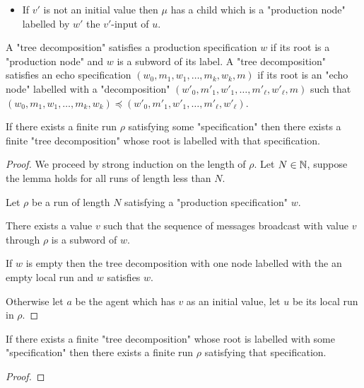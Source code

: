 \begin{definition}
\begin{itemize}
\begin{itemize}
			\item If $v'$ is not an initial value then $\mu$ has a child which is a "production node" labelled by $w'$ the $v'$-input of $u$.
		\end{itemize}
	\end{itemize}
\end{definition}

\begin{definition}
	A "tree decomposition" satisfies a production specification $w$ if its root is a "production node" and $w$ is a subword of its label.
	A "tree decomposition" satisfies an echo specification $(w_0, m_1, w_1, \ldots, m_k, w_k,m)$ if its root is an "echo node" labelled with a "decomposition" $(w'_0, m'_1, w'_1, \ldots, m'_\ell, w'_\ell,m)$ such that  $(w_0, m_1, w_1, \ldots, m_k, w_k) \preceq (w'_0, m'_1, w'_1, \ldots, m'_\ell, w'_\ell)$.
\end{definition}



\begin{lemma}
	If there exists a finite run $\rho$ satisfying some "specification" then there exists a finite "tree decomposition" whose root is labelled with that specification.
\end{lemma}

\begin{proof}
	We proceed by strong induction on the length of $\rho$.
	Let $N \in \mathbb{N}$, suppose the lemma holds for all runs of length less than $N$.
	
	Let $\rho$ be a run of length $N$ satisfying a "production specification" $w$.
		
	There exists a value $v$ such that the sequence of messages broadcast with value $v$ through $\rho$ is a subword of $w$.
	
	If $w$ is empty then the tree decomposition with one node labelled with the an empty local run and $w$ satisfies $w$.	
	
	Otherwise let $a$ be the agent which has $v$ as an initial value, let $u$ be its local run in $\rho$.
\end{proof}

\begin{lemma}
	If there exists a finite "tree decomposition" whose root is labelled with some "specification" then there exists  a finite run $\rho$ satisfying that specification.
\end{lemma}

\begin{proof}
\end{proof}

